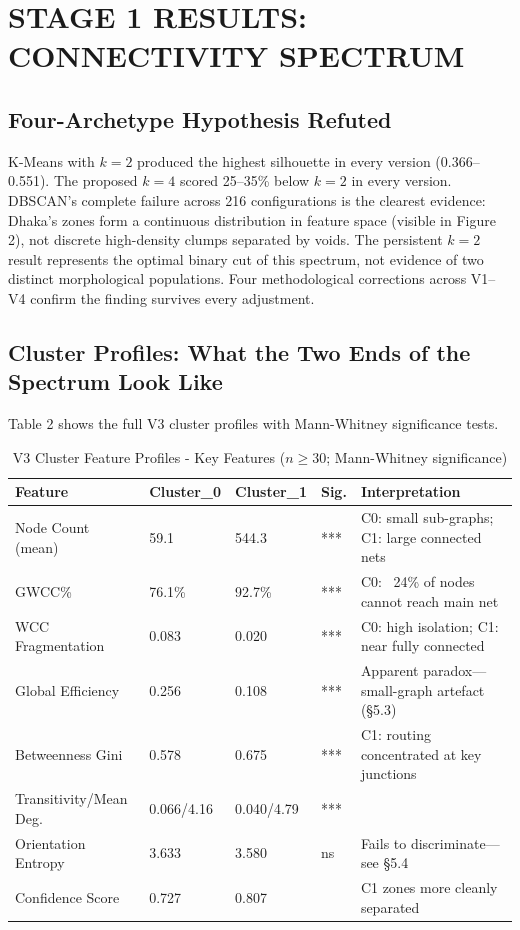 \documentclass[sigconf, nonacm]{acmart}
\begin{document}
\section{STAGE 1 RESULTS: CONNECTIVITY SPECTRUM}

\subsection{Four-Archetype Hypothesis Refuted}

K-Means with $k = 2$ produced the highest silhouette in every version (0.366--0.551). The proposed $k = 4$ scored 25--35\% below $k = 2$ in every version. DBSCAN's complete failure across 216 configurations is the clearest evidence: Dhaka's zones form a continuous distribution in feature space (visible in Figure 2), not discrete high-density clumps separated by voids. The persistent $k = 2$ result represents the optimal binary cut of this spectrum, not evidence of two distinct morphological populations. Four methodological corrections across V1--V4 confirm the finding survives every adjustment.

\subsection{Cluster Profiles: What the Two Ends of the Spectrum Look Like}
Table 2 shows the full V3 cluster profiles with Mann-Whitney significance tests.

\begin{table}[t]
\caption{V3 Cluster Feature Profiles - Key Features ($n\ge30$; Mann-Whitney significance)}
\begin{tabular}{p{2.5cm}llll}
\toprule
Feature & Cluster\_0 & Cluster\_1 & Sig. & Interpretation \\
\midrule
Node Count (mean) & 59.1 & 544.3 & *** & C0: small sub-graphs; C1: large connected nets \\
GWCC\% & 76.1\% & 92.7\% & *** & C0: ~24\% of nodes cannot reach main net \\
WCC Fragmentation & 0.083 & 0.020 & *** & C0: high isolation; C1: near fully connected \\
Global Efficiency & 0.256 & 0.108 & *** & Apparent paradox---small-graph artefact (§5.3) \\
Betweenness Gini & 0.578 & 0.675 & *** & C1: routing concentrated at key junctions \\
Transitivity/Mean Deg. & 0.066/4.16 & 0.040/4.79 & *** &  \\
Orientation Entropy & 3.633 & 3.580 & ns & Fails to discriminate---see §5.4 \\
Confidence Score & 0.727 & 0.807 & & C1 zones more cleanly separated \\
\bottomrule
\end{tabular}
\end{table}
\end{document}
